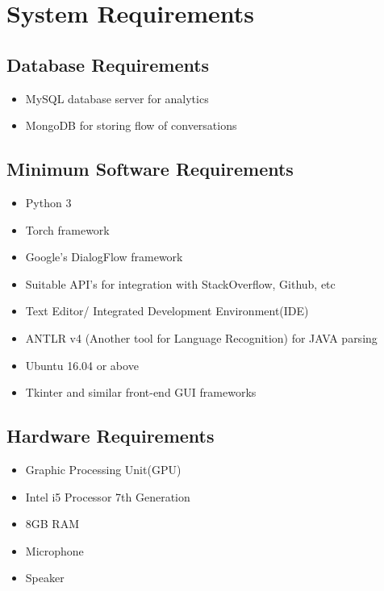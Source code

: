 \documentclass[oneside,a4paper,12pt, times]{book}
\begin{document}


\section{System  Requirements } 

\subsection{Database Requirements}
\begin{itemize}
    \item 
        MySQL database server for analytics
    \item 
        MongoDB for storing flow of conversations
\end{itemize}

\subsection{Minimum Software Requirements}
\begin{itemize}
    \item 
        Python 3
    \item 
        Torch framework
    \item 
        Google's DialogFlow framework
    \item 
        Suitable API's for integration with StackOverflow, Github, etc
    \item 
        Text Editor/ Integrated Development Environment(IDE)
    \item 
        ANTLR v4 (Another tool for Language Recognition) for JAVA parsing
    \item 
        Ubuntu 16.04 or above
    \item 
        Tkinter and similar front-end GUI frameworks
\end{itemize}

\subsection{Hardware Requirements}
\begin{itemize}
    \item 
        Graphic Processing Unit(GPU)
    \item 
        Intel i5 Processor 7th Generation
    \item   
        8GB RAM
    \item   
        Microphone
    \item   
        Speaker
\end{itemize}
\end{document}
